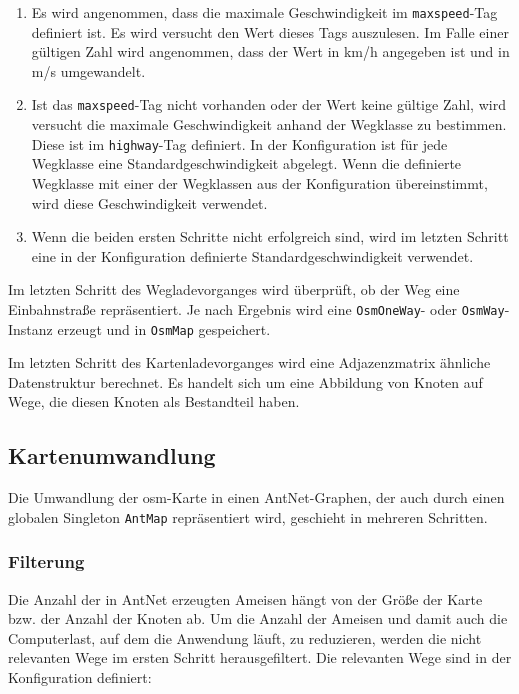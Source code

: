 \begin{enumerate}
  \item Es wird angenommen, dass die maximale Geschwindigkeit im \texttt{maxspeed}-Tag definiert ist.
    Es wird versucht den Wert dieses Tags auszulesen.
    Im Falle einer gültigen Zahl wird angenommen, dass der Wert in km/h angegeben ist und in m/s umgewandelt.
  \item Ist das \texttt{maxspeed}-Tag nicht vorhanden oder der Wert keine gültige Zahl, wird versucht die maximale Geschwindigkeit anhand der Wegklasse zu bestimmen.
    Diese ist im \texttt{highway}-Tag definiert.
    In der Konfiguration ist für jede Wegklasse eine Standardgeschwindigkeit abgelegt.
    Wenn die definierte Wegklasse mit einer der Wegklassen aus der Konfiguration übereinstimmt, wird diese Geschwindigkeit verwendet.
  \item Wenn die beiden ersten Schritte nicht erfolgreich sind, wird im letzten Schritt eine in der Konfiguration definierte Standardgeschwindigkeit verwendet.
\end{enumerate}

Im letzten Schritt des Wegladevorganges wird überprüft, ob der Weg eine Einbahnstraße repräsentiert.
Je nach Ergebnis wird eine \texttt{OsmOneWay}- oder \texttt{OsmWay}-Instanz erzeugt und in \texttt{OsmMap} gespeichert.

Im letzten Schritt des Kartenladevorganges wird eine Adjazenzmatrix ähnliche Datenstruktur berechnet.
Es handelt sich um eine Abbildung von Knoten auf Wege, die diesen Knoten als Bestandteil haben.

\subsection{Kartenumwandlung}
\label{sec:kartenumwandlung}

Die Umwandlung der \ac{osm}-Karte in einen AntNet-Graphen, der auch durch einen globalen Singleton \texttt{AntMap} repräsentiert wird, geschieht in mehreren Schritten.

\subsubsection{Filterung}
\label{sec:filterung}

Die Anzahl der in AntNet erzeugten Ameisen hängt von der Größe der Karte bzw. der Anzahl der Knoten ab.
Um die Anzahl der Ameisen und damit auch die Computerlast, auf dem die Anwendung läuft, zu reduzieren, werden die nicht relevanten Wege im ersten Schritt herausgefiltert.
Die relevanten Wege sind in der Konfiguration definiert:

